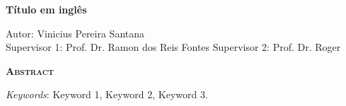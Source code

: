 \begin{center}
	{\Large{\textbf{Título em inglês}}}
\end{center}

\vspace{1cm}

\begin{flushright}
	Autor: Vinicius Pereira Santana\\
	Supervisor 1: Prof. Dr. Ramon dos Reis Fontes
    Supervisor 2: Prof. Dr. Roger
\end{flushright}

\vspace{1cm}

\begin{center}
	\Large{\textsc{\textbf{Abstract}}}
\end{center}


\noindent\textit{Keywords}: Keyword 1, Keyword 2, Keyword 3.